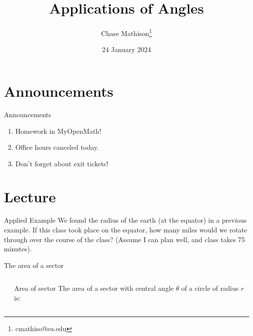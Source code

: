 \documentclass[presentation]{beamer}
\institute[SU]{Shenandoah University}
\author{Chase Mathison\thanks{cmathiso@su.edu}}
\date{24 January 2024}
\title{Applications of Angles}
\begin{document}
\maketitle

\section{Announcements}
\label{sec:org5619781}
\begin{frame}[label={sec:orgb99aee6}]{Announcements}
\begin{enumerate}
\item Homework in MyOpenMath!
\item Office hours canceled today.
\item Don't forget about exit tickets!
\end{enumerate}
\end{frame}

\section{Lecture}
\label{sec:org6289637}
\begin{frame}[label={sec:org138753f}]{Applied Example}
We found the radius of the earth (at the equator) in a previous example.  If this
class took place on the equator, how many miles would we rotate through over the course
of the class? (Assume I can plan well, and class takes 75 minutes).

\vspace{10in}
\end{frame}

\begin{frame}[label={sec:orgf9b2303}]{The area of a sector}
\begin{columns}
\begin{column}{0.45\columnwidth}
\end{column}

\begin{column}{0.45\columnwidth}
\begin{block}{Area of sector}
The area of a sector with central angle \(\theta\) of a circle of radius \(r\) is:
\vspace{1in}
\end{block}
\end{column}
\end{columns}
\end{frame}
\end{document}
